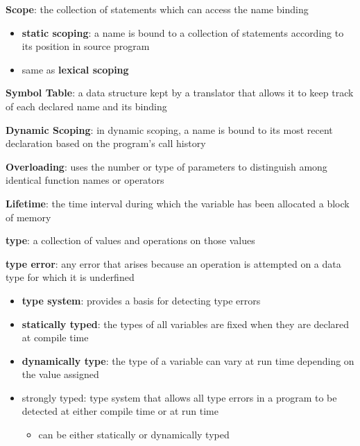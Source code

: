 \documentclass[11pt]{article} %
\begin{document}
{\bf Scope}: the collection of statements which can access the name binding
\begin{itemize}
\item {\bf static scoping}: a name is bound to a collection of statements according to its position in source program
\item same as {\bf lexical scoping}
\end{itemize}

{\bf Symbol Table}: a data structure kept by a translator that allows it to keep track of each declared name and its binding

\medskip
{\bf Dynamic Scoping}: in dynamic scoping, a name is bound to its most recent declaration based on the program's call history

\medskip
{\bf Overloading}: uses the number or type of parameters to distinguish among identical function names or operators

\medskip
{\bf Lifetime}: the time interval during which the variable has been allocated a block of memory

\medskip
{\bf type}: a collection of values and operations on those values

\medskip
{\bf type error}: any error that arises because an operation is attempted on a data type for which it is underfined
\begin{itemize}
\item {\bf type system}: provides a basis for detecting type errors
\item {\bf statically typed}: the types of all variables are fixed when they are declared at compile time
\item {\bf dynamically type}: the type of a variable can vary at run time depending on the value assigned
\item {\bg strongly typed}: type system that allows all type errors in a program to be detected at either compile time or at run time
\begin{itemize}
\item can be either statically or dynamically typed
\end{itemize}
\end{itemize}
\end{document}

